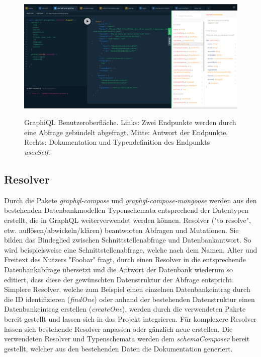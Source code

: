 \begin{figure}
	\centering
    \includegraphics[width=\textwidth]{sources/graphiql.png}\cite{}
	\caption{GraphiQL Benutzeroberfläche. Links: Zwei Endpunkte werden durch eine Abfrage gebündelt abgefragt. Mitte: Antwort der Endpunkte. Rechts: Dokumentation und Typendefinition des Endpunkts \textit{userSelf}.}
	\label{fig:gql:1}
\end{figure}

\subsection{Resolver}
Durch die Pakete \textit{graphql-compose} und \textit{graphql-compose-mongoose} werden aus den bestehenden Datenbankmodellen Typenschemata entsprechend der Datentypen erstellt, die in GraphQL weiterverwendet werden können. 
Resolver ("to resolve", etw. auflösen/abwickeln/klären) beantworten Abfragen und Mutationen.
Sie bilden das Bindeglied zwischen Schnittstellenabfrage und Datenbankantwort.
So wird beispielsweise eine Schnittstellenabfrage, welche nach dem Namen, Alter und Freitext des Nutzers "Foobar" fragt, durch einen Resolver in die entsprechende Datenbankabfrage übersetzt und die Antwort der Datenbank wiederum so editiert, dass diese der gewünschten Datenstruktur der Abfrage entspricht. %
Simplere Resolver, welche zum Beispiel einen einzelnen Datenbankeintrag durch die ID identifizieren (\textit{findOne}) oder anhand der bestehenden Datenstruktur einen Datenbankeintrag erstellen (\textit{createOne}), werden durch die verwendeten Pakete bereit gestellt und lassen sich in das Projekt integrieren.
Für komplexere Resolver lassen sich bestehende Resolver anpassen oder gänzlich neue erstellen.
Die verwendeten Resolver und Typenschemata werden dem \textit{schemaComposer} bereit gestellt, welcher aus den bestehenden Daten die Dokumentation generiert.


